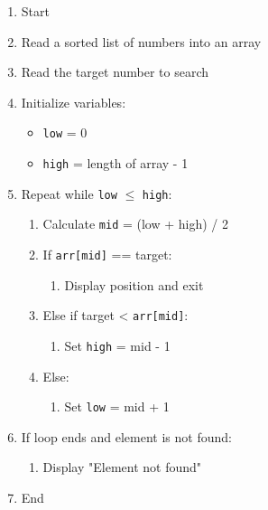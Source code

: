 \begin{enumerate}
    \item Start
    \item Read a sorted list of numbers into an array
    \item Read the target number to search
    \item Initialize variables:
    \begin{itemize}
        \item \texttt{low} = 0
        \item \texttt{high} = length of array - 1
    \end{itemize}
    \item Repeat while \texttt{low} $\leq$ \texttt{high}:
    \begin{enumerate}
        \item Calculate \texttt{mid} = (low + high) / 2
        \item If \texttt{arr[mid]} == target:
        \begin{enumerate}
            \item Display position and exit
        \end{enumerate}
        \item Else if target < \texttt{arr[mid]}:
        \begin{enumerate}
            \item Set \texttt{high} = mid - 1
        \end{enumerate}
        \item Else:
        \begin{enumerate}
            \item Set \texttt{low} = mid + 1
        \end{enumerate}
    \end{enumerate}
    \item If loop ends and element is not found:
    \begin{enumerate}
        \item Display "Element not found"
    \end{enumerate}
    \item End
\end{enumerate}

